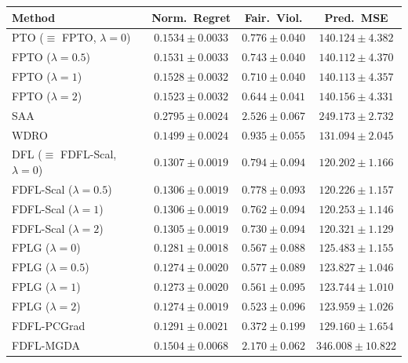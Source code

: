 \begin{table}[htbp]
\smallskip
\begin{tabular}{l ccc}
\toprule
Method & Norm.\ Regret & Fair.\ Viol. & Pred.\ MSE \\
\midrule
PTO ($\equiv$ FPTO, $\lambda\!=\!0$)         & $0.1534 \pm 0.0033$ & $0.776 \pm 0.040$ & $140.124 \pm 4.382$ \\
FPTO ($\lambda\!=\!0.5$)                     & $0.1531 \pm 0.0033$ & $0.743 \pm 0.040$ & $140.112 \pm 4.370$ \\
FPTO ($\lambda\!=\!1$)                       & $0.1528 \pm 0.0032$ & $0.710 \pm 0.040$ & $140.113 \pm 4.357$ \\
FPTO ($\lambda\!=\!2$)                       & $0.1523 \pm 0.0032$ & $0.644 \pm 0.041$ & $140.156 \pm 4.331$ \\
\midrule
SAA                                          & $0.2795 \pm 0.0024$ & $2.526 \pm 0.067$ & $249.173 \pm 2.732$ \\
WDRO                                         & $0.1499 \pm 0.0024$ & $0.935 \pm 0.055$ & $131.094 \pm 2.045$ \\
\midrule
DFL ($\equiv$ FDFL-Scal, $\lambda\!=\!0$)    & $0.1307 \pm 0.0019$ & $0.794 \pm 0.094$ & $\mathbf{120.202 \pm 1.166}$ \\
FDFL-Scal ($\lambda\!=\!0.5$)                & $0.1306 \pm 0.0019$ & $0.778 \pm 0.093$ & $120.226 \pm 1.157$ \\
FDFL-Scal ($\lambda\!=\!1$)                  & $0.1306 \pm 0.0019$ & $0.762 \pm 0.094$ & $120.253 \pm 1.146$ \\
FDFL-Scal ($\lambda\!=\!2$)                  & $0.1305 \pm 0.0019$ & $0.730 \pm 0.094$ & $120.321 \pm 1.129$ \\
\midrule
FPLG ($\lambda\!=\!0$)                       & $0.1281 \pm 0.0018$ & $0.567 \pm 0.088$ & $125.483 \pm 1.155$ \\
FPLG ($\lambda\!=\!0.5$)                     & $0.1274 \pm 0.0020$ & $0.577 \pm 0.089$ & $123.827 \pm 1.046$ \\
FPLG ($\lambda\!=\!1$)                       & $\mathbf{0.1273 \pm 0.0020}$ & $0.561 \pm 0.095$ & $123.744 \pm 1.010$ \\
FPLG ($\lambda\!=\!2$)                       & $0.1274 \pm 0.0019$ & $0.523 \pm 0.096$ & $123.959 \pm 1.026$ \\
\midrule
FDFL-PCGrad                                  & $0.1291 \pm 0.0021$ & $\mathbf{0.372 \pm 0.199}$ & $129.160 \pm 1.654$ \\
FDFL-MGDA                                    & $0.1504 \pm 0.0068$ & $2.170 \pm 0.062$ & $346.008 \pm 10.822$ \\
\bottomrule
\end{tabular}

\end{table}
